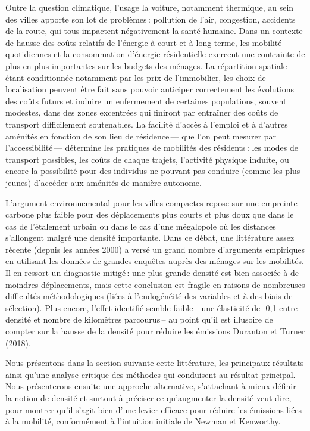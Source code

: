 \documentclass[
  9pt,
  a4paper,
  DIV=11]{scrreprt}
\begin{document}
Outre la question climatique, l'usage la voiture, notamment thermique,
au sein des villes apporte son lot de problèmes\,: pollution de l'air,
congestion, accidents de la route, qui tous impactent négativement la
santé humaine. Dans un contexte de hausse des coûts relatifs de
l'énergie à court et à long terme, les mobilité quotidiennes et la
consommation d'énergie résidentielle exercent une contrainte de plus en
plus importantes sur les budgets des ménages. La répartition spatiale
étant conditionnée notamment par les prix de l'immobilier, les choix de
localisation peuvent être fait sans pouvoir anticiper correctement les
évolutions des coûts futurs et induire un enfermement de certaines
populations, souvent modestes, dans des zones excentrées qui finiront
par entraîner des coûts de transport difficilement soutenables. La
facilité d'accès à l'emploi et à d'autres aménités en fonction de son
lieu de résidence\,--- que l'on peut mesurer par l'accessibilité\,---
détermine les pratiques de mobilités des résidents\,: les modes de
transport possibles, les coûts de chaque trajets, l'activité physique
induite, ou encore la possibilité pour des individus ne pouvant pas
conduire (comme les plus jeunes) d'accéder aux aménités de manière
autonome.

L'argument environnemental pour les villes compactes repose sur une
empreinte carbone plus faible pour des déplacements plus courts et plus
doux que dans le cas de l'étalement urbain ou dans le cas d'une
mégalopole où les distances s'allongent malgré une densité importante.
Dans ce débat, une littérature assez récente (depuis les années 2000) a
versé un grand nombre d'arguments empiriques en utilisant les données de
grandes enquêtes auprès des ménages sur les mobilités. Il en ressort un
diagnostic mitigé\,: une plus grande densité est bien associée à de
moindres déplacements, mais cette conclusion est fragile en raisons de
nombreuses difficultés méthodologiques (liées à l'endogénéité des
variables et à des biais de sélection). Plus encore, l'effet identifié
semble faible\,-- une élasticité de -0,1 entre densité et nombre de
kilomètres parcourus\,-- au point qu'il est illusoire de compter sur la
hausse de la densité pour réduire les émissions Duranton et Turner
(2018).

Nous présentons dans la section suivante cette littérature, les
principaux résultats ainsi qu'une analyse critique des méthodes qui
conduisent au résultat principal. Nous présenterons ensuite une approche
alternative, s'attachant à mieux définir la notion de densité et surtout
à préciser ce qu'augmenter la densité veut dire, pour montrer qu'il
s'agit bien d'une levier efficace pour réduire les émissions liées à la
mobilité, conformément à l'intuition initiale de Newman et Kenworthy.
\end{document}
